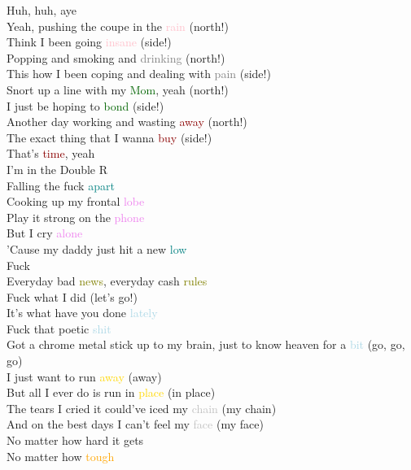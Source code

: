 \documentclass{article}
\begin{document}
Huh, huh, aye \\
Yeah, pushing the coupe in the \textcolor{pink}{rain} (north!) \\
Think I been going \textcolor{pink}{insane} (side!) \\
Popping and smoking and \textcolor{gray}{drinking} (north!) \\
This how I been coping and dealing with \textcolor{gray}{pain} (side!) \\
Snort up a line with my \textcolor{darkgreen}{Mom}, yeah (north!) \\
I just be hoping to \textcolor{darkgreen}{bond} (side!) \\
Another day working and wasting \textcolor{darkred}{away} (north!) \\
The exact thing that I wanna \textcolor{darkred}{buy} (side!) \\
That's \textcolor{darkred}{time}, yeah \\
I'm in the Double R \\
Falling the fuck \textcolor{teal}{apart} \\
Cooking up my frontal \textcolor{violet}{lobe} \\
Play it strong on the \textcolor{violet}{phone} \\
But I cry \textcolor{violet}{alone} \\
'Cause my daddy just hit a new \textcolor{teal}{low} \\
Fuck \\
Everyday bad \textcolor{olive}{news}, everyday cash \textcolor{olive}{rules} \\
Fuck what I did (let's go!) \\
It's what have you done \textcolor{lightblue}{lately} \\
Fuck that poetic \textcolor{lightblue}{shit} \\
Got a chrome metal stick up to my brain, just to know heaven for a \textcolor{lightblue}{bit} (go, go, go) \\
I just want to run \textcolor{gold}{away} (away) \\
But all I ever do is run in \textcolor{gold}{place} (in place) \\
The tears I cried it could've iced my \textcolor{silver}{chain} (my chain) \\
And on the best days I can't feel my \textcolor{silver}{face} (my face) \\
No matter how hard it gets \\
No matter how \textcolor{orange}{tough} \\
\end{document}
